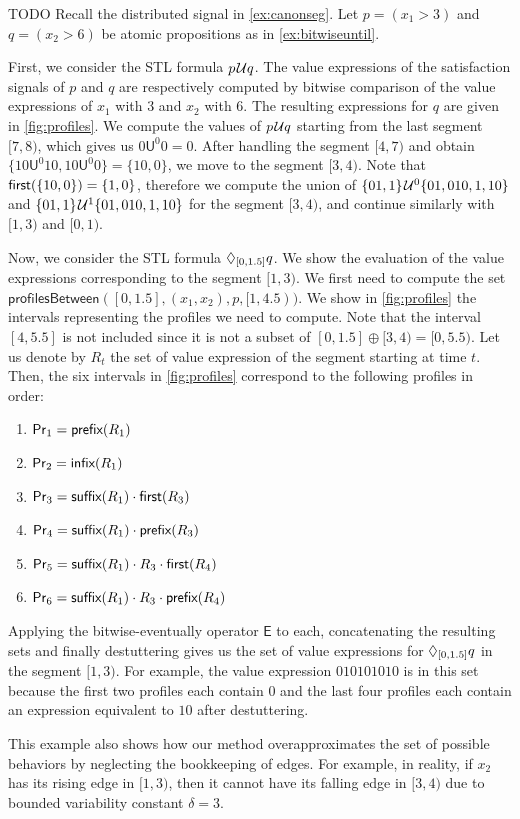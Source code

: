 \begin{example}TODO
	Recall the distributed signal in \cref{ex:canonseg}.
	Let $p = (x_1 > 3)$ and $q = (x_2 > 6)$ be atomic propositions as in \cref{ex:bitwiseuntil}.
		
	First, we consider the STL formula $p \kern.1em\mathcal{U} q$.
	The value expressions of the satisfaction signals of $p$ and $q$ are respectively computed by bitwise comparison of the value expressions of $x_1$ with 3 and $x_2$ with 6.
	The resulting expressions for $q$ are given in \cref{fig:profiles}.
	We compute the values of $p \kern.1em\mathcal{U} q$ starting from the last segment $[7,8)$, which gives us $0 \mathsf{U}^0 0 = 0$.
	After handling the segment $[4,7)$ and obtain $\{ 10 \mathsf{U}^0 10, 10 \mathsf{U}^0 0 \} = \{10, 0\}$, we move to the segment $[3,4)$.
	Note that $\textsf{first}(\{10, 0\}) = \{1,0\}$, therefore we compute the union of $\{01, 1\} \kern.1em\mathcal{U}^0 \{01, 010, 1, 10\}$ and $\{01, 1\} \kern.1em\mathcal{U}^1 \{01, 010, 1, 10\}$ for the segment $[3,4)$, and continue similarly with $[1,3)$ and $[0,1)$.
	
	Now, we consider the STL formula $\lozenge_{[0,1.5]} q$.
	We show the evaluation of the value expressions corresponding to the segment $[1,3)$.
	We first need to compute the set $\mathsf{profilesBetween}([0,1.5], (x_1, x_2), p, [1,4.5))$.
	We show in \cref{fig:profiles} the intervals representing the profiles we need to compute.
	Note that the interval $[4, 5.5]$ is not included since it is not a subset of $[0, 1.5] \oplus [3,4) = [0,5.5)$.
	Let us denote by $R_t$ the set of value expression of the segment starting at time $t$.
	Then, the six intervals in \cref{fig:profiles} correspond to the following profiles in order:
	\begin{enumerate}
		\item $\mathsf{Pr}_1 = \textsf{prefix}(R_1)$
		\item $\mathsf{Pr}_2 = \textsf{infix}(R_1)$
		\item $\mathsf{Pr}_3 = \textsf{suffix}(R_1) \cdot \textsf{first}(R_3)$
		\item $\mathsf{Pr}_4 = \textsf{suffix}(R_1) \cdot \textsf{prefix}(R_3)$
		\item $\mathsf{Pr}_5 = \textsf{suffix}(R_1) \cdot R_3 \cdot \textsf{first}(R_4)$
		\item $\mathsf{Pr}_6 = \textsf{suffix}(R_1) \cdot R_3 \cdot \textsf{prefix}(R_4)$
	\end{enumerate}
	Applying the bitwise-eventually operator $\mathsf{E}$ to each, concatenating the resulting sets and finally destuttering gives us the set of value expressions for $\lozenge_{[0,1.5]} q$ in the segment $[1,3)$.
	For example, the value expression $0 10 10 10 10$ is in this set because the first two profiles each contain $0$ and the last four profiles each contain an expression equivalent to $10$ after destuttering.
	
	This example also shows how our method overapproximates the set of possible behaviors by neglecting the bookkeeping of edges.
	For example, in reality, if $x_2$ has its rising edge in $[1,3)$, then it cannot have its falling edge in $[3,4)$ due to bounded variability constant $\delta = 3$.	
\end{example}

